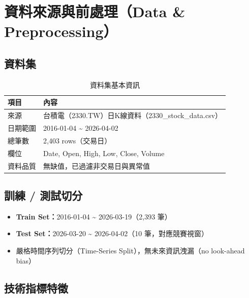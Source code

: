 \documentclass[12pt,a4paper]{article}
\begin{document}
\section{資料來源與前處理（Data \& Preprocessing）}

\subsection{資料集}

\begin{table}[H]
\centering
\caption{資料集基本資訊}
\begin{tabular}{ll}
\toprule
\textbf{項目} & \textbf{內容} \\
\midrule
來源 & 台積電（2330.TW）日K線資料（2330\_stock\_data.csv） \\
日期範圍 & 2016-01-04 \textasciitilde{} 2026-04-02 \\
總筆數 & 2,403 rows（交易日） \\
欄位 & Date, Open, High, Low, Close, Volume \\
資料品質 & 無缺值，已過濾非交易日與異常值 \\
\bottomrule
\end{tabular}
\end{table}

\subsection{訓練 / 測試切分}

\begin{itemize}
  \item \textbf{Train Set：}2016-01-04 \textasciitilde{} 2026-03-19（2,393 筆）
  \item \textbf{Test Set：}2026-03-20 \textasciitilde{} 2026-04-02（10 筆，對應競賽視窗）
  \item 嚴格時間序列切分（Time-Series Split），無未來資訊洩漏（no look-ahead bias）
\end{itemize}

\subsection{技術指標特徵}
\end{document}
